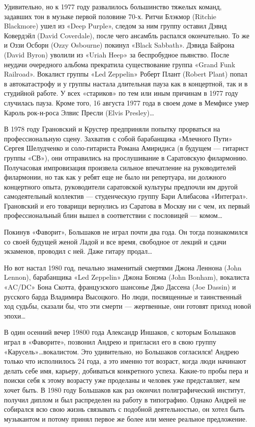 \documentclass[16pt,a5paper]{book}
\begin{document}
Удивительно, но к 1977 году развалилось большинство тяжелых команд, задавших тон в музыке первой половине 70-х.
Ритчи Блэкмор (Ritchie Blackmore) ушел из «Deep Purple», следом за ним группу оставил Дэвид Ковердэйл (David Coverdale),
после чего ансамбль распался окончательно. То же и Оззи Осборн (Ozzy Osbourne) покинул «Black Sabbath». Дэвида Байрона
(David Byron) уволили из «Uriah Heep» за беспробудное пьянство. После неудачи очередного альбома прекратила
существование группа «Grand Funk Railroad». Вокалист группы «Led Zeppelin» Роберт Плант (Robert Plant) попал в
автокатастрофу и у группы настала длительная пауза как в концертной, так и в студийной работе. У всех «стариков» по тем
или иным причинам в 1977 году случилась пауза. Кроме того, 16 августа 1977 года в своем доме в Мемфисе умер Кароль
рок-н-роса Элвис Пресли (Elvis Presley)\ldots

В 1978 году Грановский и Крустер предприняли попытку прорваться на профессиональную сцену. Захватив с собой барабанщика
«Млечного Пути» Сергея Шелудченко и соло-гитариста Романа Амиридиса (в будущем — гитарист группы «СВ»), они отправились
на прослушивание в Саратовскую филармонию. Получасовая импровизация произвела сильное впечатление на руководителей
филармонии, но так как у ребят еще не было ни репертуара, ни должного концертного опыта, руководители саратовской
культуры предпочли им другой самодеятельный коллектив — студенческую группу Бари Алибасова «Интеграл». Грановский и его
товарищи вернулись из Саратова в Москву ни с чем, их первый профессиональный блин вышел в соответствии с пословицей —
комом\ldots

Покинув «Фаворит», Большаков не играл почти два года. Он тогда познакомился со своей будущей женой Ладой и все время,
свободное от лекций и сдачи экзаменов, проводил с ней. Даже гитару продал\ldots

Но вот настал 1980 год, печально знаменитый смертями Джона Леннона (John Lennon), барабанщика «Led Zeppelin» Джона
Бонэма (John Bonham), вокалиста «AC/DC» Бона Скотта, французского шансонье Джо Дассена (Joe Dassin) и русского барда
Владимира Высоцкого. Но люди, посвященные и таинственный ход судьбы, сказали бы, что эти смерти — жертвенные, они
готовят приход новой эпохи\ldots

В один осенний вечер 19800 года Александр Иншаков, с которым Большаков играл в «Фаворите», позвонил Андрею и пригласил
его в свою группу «Карусель»\ldots вокалистом. Это удивительно, но Большаков согласился! Андрею только что исполнилось
24 года, а это именно тот возраст, когда люди начинают делать себе имя, карьеру, добиваться конкретного успеха. Какие-то
пробы пера и поиски себя к этому возрасту уже проделаны и человек уже представляет, кем хочет быть. В 1980 году
Большаков как раз окончил полиграфический институт, получил диплом и был распределен на работу в типографию. Однако
Андрей не собирался всю свою жизнь связывать с подобной деятельностью, он хотел быть музыкантом и потому принял первое
же более или менее реальное предложение.
\end{document}
